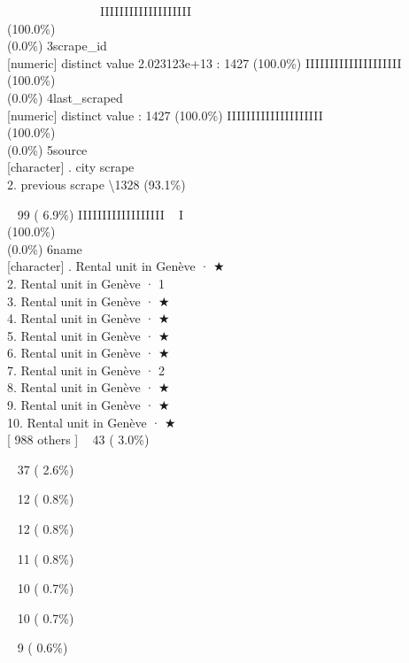 \documentclass[
  journal,
]{IEEEtran}%
\begin{document}
~ ~ ~ ~ ~ ~ ~ ~ ~ IIIIIIIIIIIIIIIIIII \\
(100.0\%) \\
(0.0\%) \textbar{} \textbar{} 3\textbar scrape\_id\\
{[}numeric{]}  distinct value \textbar2.023123e+13 : 1427
(100.0\%) \textbar{} \textbar IIIIIIIIIIIIIIIIIIII \\
(100.0\%) \\
(0.0\%) \textbar{} \textbar{} 4\textbar last\_scraped\\
{[}numeric{]}  distinct value  : 1427 (100.0\%)
\textbar{} \textbar IIIIIIIIIIIIIIIIIIII \\
(100.0\%) \\
(0.0\%) \textbar{} \textbar{} 5\textbar source\\
{[}character{]} . city scrape\\
2. previous scrape \textbar\textbackslash1328 (93.1\%)\\
\strut ~ 99 ( 6.9\%) \textbar{} \textbar IIIIIIIIIIIIIIIIII ~ I
\\
(100.0\%) \\
(0.0\%) \textbar{} \textbar{} 6\textbar name\\
{[}character{]} . Rental unit in Genève · ★\\
2. Rental unit in Genève · 1\\
3. Rental unit in Genève · ★\\
4. Rental unit in Genève · ★\\
5. Rental unit in Genève · ★\\
6. Rental unit in Genève · ★\\
7. Rental unit in Genève · 2\\
8. Rental unit in Genève · ★\\
9. Rental unit in Genève · ★\\
10. Rental unit in Genève · ★\\
{[} 988 others {]} \textbar~ 43 ( 3.0\%)\\
\strut ~ 37 ( 2.6\%)\\
\strut ~ 12 ( 0.8\%)\\
\strut ~ 12 ( 0.8\%)\\
\strut ~ 11 ( 0.8\%)\\
\strut ~ 10 ( 0.7\%)\\
\strut ~ 10 ( 0.7\%)\\
\strut ~ 9 ( 0.6\%)\\
\end{document}
